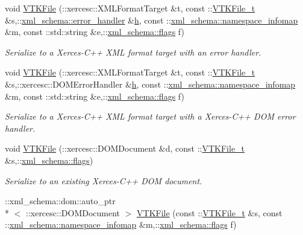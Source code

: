 \begin{DoxyCompactItemize}
void \hyperlink{vtk-unstructured_8cpp_ab09b4a244a093deff01c76e0d066b039}{V\-T\-K\-File} (\-::xercesc\-::\-X\-M\-L\-Format\-Target \&t, const \-::\hyperlink{classVTKFile__t}{V\-T\-K\-File\-\_\-t} \&s,\-::\hyperlink{namespacexml__schema_a0a5d9528e9175cedf199984a8bb64d62}{xml\-\_\-schema\-::error\-\_\-handler} \&\hyperlink{MolSim_8cpp_aa6e8e201edf24007dc075bfef6e8210c}{h}, const \-::\hyperlink{namespacexml__schema_ad52b6e3505153cb30ba3452f7868450e}{xml\-\_\-schema\-::namespace\-\_\-infomap} \&m, const \-::std\-::string \&e,\-::\hyperlink{namespacexml__schema_a0612287d030cb2732d31a45b258fdc87}{xml\-\_\-schema\-::flags} f)
\begin{DoxyCompactList}\small\item\em Serialize to a Xerces-\/\-C++ X\-M\-L format target with an error handler. \end{DoxyCompactList}\item 
void \hyperlink{vtk-unstructured_8cpp_a08394e720690e6ac839c4c06f06fe1c7}{V\-T\-K\-File} (\-::xercesc\-::\-X\-M\-L\-Format\-Target \&t, const \-::\hyperlink{classVTKFile__t}{V\-T\-K\-File\-\_\-t} \&s,\-::xercesc\-::\-D\-O\-M\-Error\-Handler \&\hyperlink{MolSim_8cpp_aa6e8e201edf24007dc075bfef6e8210c}{h}, const \-::\hyperlink{namespacexml__schema_ad52b6e3505153cb30ba3452f7868450e}{xml\-\_\-schema\-::namespace\-\_\-infomap} \&m, const \-::std\-::string \&e,\-::\hyperlink{namespacexml__schema_a0612287d030cb2732d31a45b258fdc87}{xml\-\_\-schema\-::flags} f)
\begin{DoxyCompactList}\small\item\em Serialize to a Xerces-\/\-C++ X\-M\-L format target with a Xerces-\/\-C++ D\-O\-M error handler. \end{DoxyCompactList}\item 
void \hyperlink{vtk-unstructured_8cpp_a5303826a26dc8b0981ea314365205514}{V\-T\-K\-File} (\-::xercesc\-::\-D\-O\-M\-Document \&d, const \-::\hyperlink{classVTKFile__t}{V\-T\-K\-File\-\_\-t} \&s,\-::\hyperlink{namespacexml__schema_a0612287d030cb2732d31a45b258fdc87}{xml\-\_\-schema\-::flags})
\begin{DoxyCompactList}\small\item\em Serialize to an existing Xerces-\/\-C++ D\-O\-M document. \end{DoxyCompactList}\item 
\-::xml\-\_\-schema\-::dom\-::auto\-\_\-ptr\\*
$<$ \-::xercesc\-::\-D\-O\-M\-Document $>$ \hyperlink{vtk-unstructured_8cpp_a6e2336ff7eefc4b5fd245cc8c12815c6}{V\-T\-K\-File} (const \-::\hyperlink{classVTKFile__t}{V\-T\-K\-File\-\_\-t} \&s, const \-::\hyperlink{namespacexml__schema_ad52b6e3505153cb30ba3452f7868450e}{xml\-\_\-schema\-::namespace\-\_\-infomap} \&m,\-::\hyperlink{namespacexml__schema_a0612287d030cb2732d31a45b258fdc87}{xml\-\_\-schema\-::flags} f)

\end{DoxyCompactItemize}
